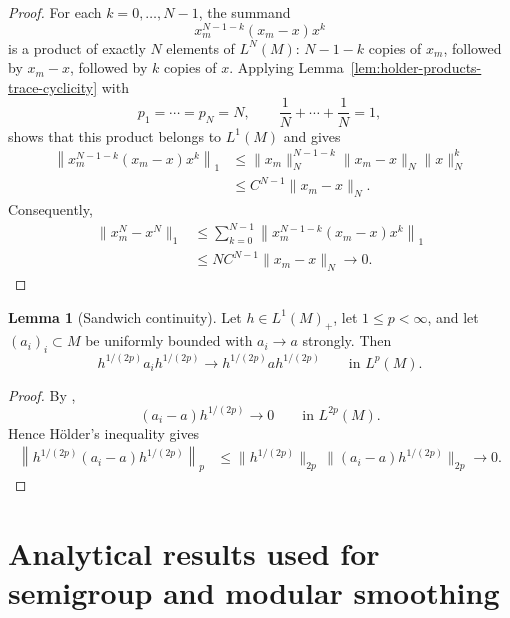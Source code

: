 \documentclass[11pt,a4paper]{article}
\theoremstyle{plain}
\numberwithin{theorem}{section}
\theoremstyle{definition}
\newtheorem{lemma}[theorem]{Lemma}
\newcommand{\?}{\overset{?}{=}}
\begin{document}
\begin{appendix}
\begin{proof}
For each \(k=0,\ldots,N-1\), the summand
\begin{equation*}
    x_m^{N-1-k}(x_m-x)x^k
\end{equation*}
is a product of exactly \(N\) elements of \(L^N(M)\): \(N-1-k\)
copies of \(x_m\), followed by \(x_m-x\), followed by \(k\) copies of
\(x\). 
Applying Lemma~\ref{lem:holder-products-trace-cyclicity} with
\begin{equation*}
    p_1=\cdots=p_N=N,
    \qquad
    \frac{1}{N}+\cdots+\frac{1}{N}=1,
\end{equation*}
shows that this product belongs to \(L^1(M)\) and gives
\begin{align*}
    \left\|
        x_m^{N-1-k}(x_m-x)x^k
    \right\|_1
    &\leq
    \|x_m\|_N^{N-1-k}
    \|x_m-x\|_N
    \|x\|_N^k
    \\
    &\leq
    C^{N-1}\|x_m-x\|_N.
\end{align*}
Consequently,
\begin{align*}
    \|x_m^N-x^N\|_1
    &\leq
    \sum_{k=0}^{N-1}
    \left\|
        x_m^{N-1-k}(x_m-x)x^k
    \right\|_1
    \\
    &\leq
    N C^{N-1}\|x_m-x\|_N
    \longrightarrow 0.
\end{align*}
\end{proof}

\begin{lemma}[Sandwich continuity]\label{lem:sandwich-continuity}
Let \(h\in L^1(M)_+\), let \(1\le p<\infty\), and let
\((a_i)_i\subset M\) be uniformly bounded with \(a_i\to a\) strongly.  Then
\[
        h^{1/(2p)}a_i h^{1/(2p)}
        \longrightarrow
        h^{1/(2p)}a h^{1/(2p)}
        \qquad\text{in }L^p(M).
\]
\end{lemma}

\begin{proof}
By \cite[Lemma 2.3]{Junge:2002osf},
\[
        (a_i-a)h^{1/(2p)}
        \longrightarrow0
        \qquad\text{in }L^{2p}(M).
\]
Hence H\"older's inequality gives
\[
\begin{aligned}
\left\|
        h^{1/(2p)}(a_i-a)h^{1/(2p)}
\right\|_p
&\le
        \|h^{1/(2p)}\|_{2p}
        \,
        \|(a_i-a)h^{1/(2p)}\|_{2p}
        \longrightarrow0 .
\end{aligned}
\]
\end{proof}


\section{Analytical results used for semigroup and modular smoothing}\label{Sec:misc-results-Sec45}


\end{appendix}
\end{document}
